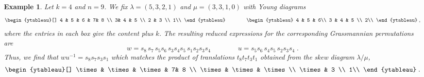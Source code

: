 \documentclass[12pt]{amsart}
\newtheorem{example}[prop]{Example}
\numberwithin{equation}{section}
\numberwithin{figure}{section}
\begin{document}
\begin{example}\rm
    Let $k=4$ and $n=9$. We fix $\lambda=(5,3,2,1)$ and $\mu=(3,3,1,0)$ with Young diagrams
    \[
    \begin{ytableau}[]
     4 & 5 & 6 & 7& 8  \\ 3& 4 & 5 \\ 2 & 3 \\ 1\\   
    \end{ytableau}  \qquad \qquad
    \begin{ytableau}
        4 & 5 & 6\\ 3 & 4 & 5 \\ 2\\
    \end{ytableau}\;,
    \]
    where the entries in each box give the content plus $k$. The resulting reduced expressions for the corresponding Grassmannian permutations are
    \[
    w=s_8\,s_7\,s_5s_6\,s_3s_4s_5\, s_1s_2s_3s_4\qquad\qquad
    u=s_5s_6\,s_4s_5\,s_2s_3s_4\;.
    \]
    Thus, we find that $wu^{-1}=s_8s_7s_3s_1$ which matches the product of translations $t_8t_7t_3t_1$ obtained from the skew diagram $\lambda/\mu$,
    \[
    \begin{ytableau}[]
      \times & \times & \times & 7& 8  \\ \times & \times & \times \\  \times & 3 \\ 1\\   
    \end{ytableau}\;.
    \]
\end{example}
\end{document}

